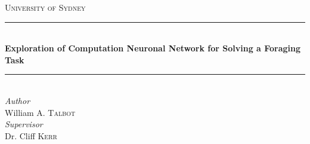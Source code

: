 \documentclass[11pt, twocolumn]{article}
\begin{document}
	\begin{titlepage} 
		\newcommand{\HRule}{\rule{\linewidth}{0.5mm}} %
		
		\center %
		
		
		\textsc{\LARGE University of Sydney}\\[1.5cm] %
		
		
		
		
		\HRule\\[0.4cm]
		
		{\huge\bfseries Exploration of Computation Neuronal Network for Solving a Foraging Task}\\[0.4cm] %
		
		\HRule\\[1.5cm]
		
		
		
		{\large\textit{Author}}\\
		William A. \textsc{Talbot}\\ %
		{\large\textit{Supervisor}}\\
		Dr. Cliff \textsc{Kerr} %
		

\end{titlepage}
\end{document}
